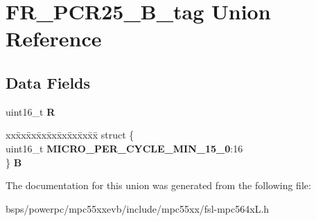 \hypertarget{unionFR__PCR25__16B__tag}{}\section{F\+R\+\_\+\+P\+C\+R25\+\_\+B\+\_\+tag Union Reference}
\label{unionFR__PCR25__16B__tag}
\subsection*{Data Fields}
\begin{DoxyCompactItemize}
\item 
\mbox{\label{unionFR__PCR25__16B__tag_aa3baf21ec488aa442b023ff037b20d80}} 
uint16\+\_\+t {\bfseries R}
\item 
\mbox{\label{unionFR__PCR25__16B__tag_a5aa0841aca458eae93c55e64bd99ab5b}} 
\begin{tabbing}
xx\=xx\=xx\=xx\=xx\=xx\=xx\=xx\=xx\=\kill
struct \{\\
\>uint16\_t {\bfseries MICRO\_PER\_CYCLE\_MIN\_15\_0}:16\\
\} {\bfseries B}\\

\end{tabbing}\end{DoxyCompactItemize}


The documentation for this union was generated from the following file\+:\begin{DoxyCompactItemize}
\item 
bsps/powerpc/mpc55xxevb/include/mpc55xx/fsl-\/mpc564x\+L.\+h\end{DoxyCompactItemize}

